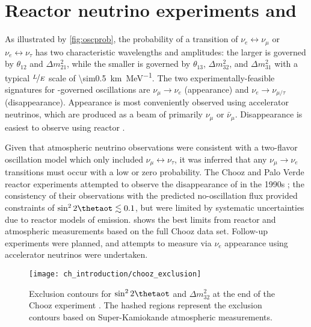 \section{Reactor neutrino experiments and \texorpdfstring{\thetaot}{theta13}}
\label{sec:experiment_intro}

As illustrated by \cref{fig:oscprob},
the probability of a transition of $\nu_e \leftrightarrow \nu_\mu$
or $\nu_e \leftrightarrow \nu_\tau$
has two characteristic wavelengths and amplitudes:
the larger is governed by $\theta_{12}$ and $\Delta m^2_{21}$,
while the smaller is governed by
$\theta_{13}$, $\Delta m^2_{32}$, and $\Delta m^2_{31}$
with a typical $\nicefrac{L}{E}$ scale of \SI{\sim0.5}{\km\per\MeV}.
The two experimentally-feasible signatures for \thetaot{}-governed oscillations
are $\nu_\mu\to\nu_e$ (appearance) and $\nu_e\to\nu_{\mu/\tau}$ (disappearance).
Appearance is most conveniently observed using accelerator neutrinos,
which are produced as a beam of primarily $\nu_\mu$ or $\bar{\nu}_\mu$.
Disappearance is easiest to observe using reactor \nuebar.

Given that atmospheric neutrino observations were consistent
with a two-flavor oscillation model which only included $\nu_\mu\leftrightarrow\nu_\tau$,
it was inferred that any $\nu_\mu\to\nu_e$ transitions
must occur with a low or zero probability.
The Chooz and Palo Verde reactor \nuebar{} experiments
attempted to observe the disappearance of \nuebar{} in the 1990s
\cite{chooz1999,paloverde2001};
the consistency of their observations with the predicted no-oscillation flux
provided constraints of $\sin^22\thetaot \lesssim 0.1$,
but were limited by systematic uncertainties
due to reactor models of \nuebar{} emission.
 shows the best limits
from reactor and atmospheric measurements
based on the full Chooz data set.
Follow-up experiments were planned,
and attempts to measure \thetaot{} via $\nu_e$ appearance
using accelerator neutrinos were undertaken.

\begin{figure}
    \centering
    \texttt{[image: ch\_introduction/chooz\_exclusion]}
    \caption{
        Exclusion contours for $\sin^22\thetaot$ and $\Delta m^2_{32}$
        at the end of the Chooz experiment \cite{chooz1999}.
        The hashed regions represent the exclusion contours
        based on Super-Kamiokande atmospheric measurements.
    }
    \label{fig:chooz_exclusion}
\end{figure}

